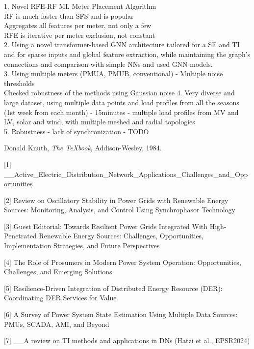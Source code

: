 \documentclass[journal]{IEEEtran}  %
\begin{document}
1. Novel RFE-RF ML Meter Placement Algorithm \\
     RF is much faster than SFS and is popular \\
     Aggregates all features per meter, not only a few\\
     RFE is iterative per meter exclusion, not constant \\
2. Using a novel transformer-based GNN architecture tailored for a SE and TI and for sparse inputs and global feature extraction, while maintaining the graph's connections and comparison with simple NNs and used GNN models.\\
3. Using multiple meters (PMUA, PMUB, conventional) - Multiple noise thresholds\\
     Checked robustness of the methods using Gaussian noise
4. Very diverse and large dataset, using multiple data points and load profiles from all the seasons (1st week from each month) - 15minutes - multiple load profiles from MV and LV, solar and wind, with multiple meshed and radial topologies \\
5. Robustness - lack of synchronization - TODO

\begin{thebibliography}{9}

Donald Knuth,
\textit{The TeXbook},
Addison-Wesley, 1984.

\end{thebibliography}

[1]
__Active_Electric_Distribution_Network_Applications_Challenges_and_Opportunities

[2]
Review on Oscillatory Stability in Power Grids with Renewable Energy Sources:  Monitoring, Analysis, and Control Using Synchrophasor Technology

[3]
Guest Editorial: Towards Resilient Power Grids Integrated With High-Penetrated Renewable Energy Sources: Challenges, Opportunities, Implementation Strategies, and Future Perspectives

[4]
The Role of Prosumers in Modern Power System Operation: Opportunities, Challenges, and Emerging Solutions

[5]
Resilience-Driven Integration of Distributed Energy Resource (DER): Coordinating DER Services for Value

[6]
A Survey of Power System State Estimation Using Multiple Data Sources: PMUs, SCADA, AMI, and Beyond

[7]
__A review on TI methods and applications in DNs (Hatzi et al., EPSR2024)
\end{document}
